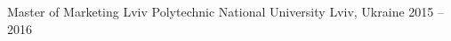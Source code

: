 

\begin{cventries}

  \cventry
    {Master of Marketing} %
    {Lviv Polytechnic National University} %
    {Lviv, Ukraine} %
    {2015 – 2016} %
    {
    }

\end{cventries}
